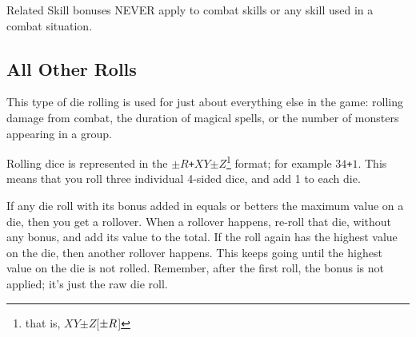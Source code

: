 \documentclass[twoside]{book}
\begin{document}
  

  
    {  
    Related Skill bonuses NEVER apply to combat skills
               or any skill used in a combat situation. 
    }
  
    

\subsection{All Other Rolls}
    
    {  
    This type of die rolling is used for just about
               everything else in the game: rolling damage from combat,
               the duration of magical spells, or the number of monsters
               appearing in a group. 
    }
  
    {  
    Rolling dice is represented in the
                \texttt{\ensuremath{\pm}}\ensuremath{R}\texttt{+}\ensuremath{X}\ensuremath{Y}\texttt{\ensuremath{\pm}}\ensuremath{Z}\footnote{ that is,
                \ensuremath{X}\ensuremath{Y}\texttt{\ensuremath{\pm}}\ensuremath{Z}[\ensuremath{\texttt{\ensuremath{\pm}}\ensuremath{R}}]} format; for
               example \ensuremath{3}\ensuremath{4}\texttt{+}\ensuremath{1}. This means that you roll three individual
               4-sided dice, and add 1 to each die. 
    }
  
    {  
    If any die roll with its bonus added in equals or
               betters the maximum value on a die, then you get a
               rollover. When a rollover happens, re-roll that die,
               without any bonus, and add its value to the total. If the
               roll again has the highest value on the die, then another
               rollover happens. This keeps going until the highest value
               on the die is not rolled. Remember, after the first roll,
               the bonus is not applied; it's just the raw die
               roll. 
    }
  
\end{document}
